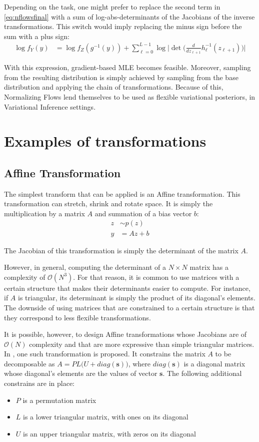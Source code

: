 Depending on the task, one might prefer to replace the second term in \ref{eq:nflowsfinal}
with a sum of log-abs-determinants of the Jacobians of the inverse transformations.
This switch would imply replacing the minus sign before the sum with a plus sign:
\begin{align}
    \log f_Y(y) &= \log f_Z(g^{-1}(y)) + \sum_{\ell=0}^{L-1} \log \Big|\det\Big(\frac{d}{dz_{\ell+1}}h_{\ell}^{-1}(z_{\ell+1})\Big) \Big|
\end{align}

With this expression, gradient-based MLE becomes feasible. Moreover, sampling
from the resulting distribution is simply achieved by sampling from the base
distribution and applying the chain of transformations. Because of this, Normalizing
Flows lend themselves to be used as flexible variational posteriors, in Variational
Inference settings.

\section{Examples of transformations}
\subsection{Affine Transformation}
The simplest transform that can be applied is an Affine transformation.
This transformation can stretch, shrink and rotate space. It is simply the 
multiplication by a matrix $A$ and summation of a bias vector $b$:
\begin{align}
    z &\sim p(z) \\
    y &= Az + b
\end{align}

The Jacobian of this transformation is simply the determinant of the matrix $A$.

However, in general, computing the determinant of a $N \times N$ matrix has a
complexity of $\mathcal{O}(N^3)$. For that reason, it is common to use matrices
with a certain structure that makes their determinants easier to compute. For
instance, if $A$ is triangular, its determinant is simply the product of its
diagonal's elements. The downside of using matrices that are constrained to
a certain structure is that they correspond to less flexible transformations.

It is possible, however, to design Affine transformations whose Jacobians are
of $\mathcal{O}(N)$ complexity and that are more expressive than simple
triangular matrices. In \cite{Glow}, one such transformation is proposed. It
constrains the matrix $A$ to be decomposable as $A = PL\big(U + diag(\mathbf{s})\big)$,
where $diag(\mathbf{s})$ is a diagonal matrix whose diagonal's elements are
the values of vector $\mathbf{s}$. The following additional constrains are in place:
\begin{itemize}
    \item $P$ is a permutation matrix
    \item $L$ is a lower triangular matrix, with ones on its diagonal
    \item $U$ is an upper triangular matrix, with zeros on its diagonal
\end{itemize}

